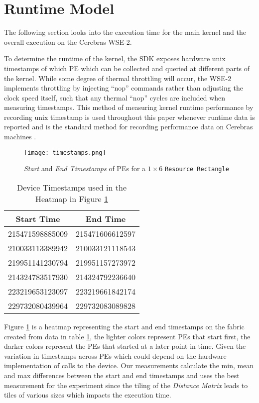 \section{Runtime Model} \label{section:execution_time}

The following section looks into the execution time for the main kernel and the overall execution on the Cerebras WSE-2.

To determine the runtime of the kernel, the SDK exposes hardware unix timestamps of which PE which can be collected and queried at different parts of the kernel. While some degree of thermal throttling will occur, the WSE-2 implements throttling by injecting “nop” commands rather than adjusting the clock speed itself, such that any thermal “nop” cycles are included when measuring timestamps. This method of measuring kernel runtime performance by recording unix timestamp is used throughout this paper whenever runtime data is reported and is the standard method for recording performance data on Cerebras machines \cite{9}.

\begin{figure}[h!]
    \texttt{[image: timestamps.png]}
    \centering
    \caption{\textit{Start} and \textit{End Timestamps} of PEs for a $1 \times 6$ \texttt{Resource Rectangle}}
    \label{fig:timestamps}
\end{figure}

\begin{table}[h]
    \centering
    \begin{tabular}{|c|c|}
        \hline
        Start Time & End Time \\
        \hline
        215471598885009 & 215471606612597 \\
        210033113389942 & 210033121118543 \\
        219951141230794 & 219951157273972 \\
        214324783517930 & 214324792236640 \\
        223219653123097 & 223219661842174 \\
        229732080439964 & 229732083089828 \\
        \hline
    \end{tabular}
    \caption{Device Timestamps used in the Heatmap in Figure \ref{fig:timestamps}}
    \label{table:timestamps}
\end{table}

Figure \ref{fig:timestamps} is a heatmap representing the start and end timestamps on the fabric created from data in table \ref{table:timestamps}, the lighter colors represent PEs that start first, the darker colors represent the PEs that started at a later point in time. Given the variation in timestamps across PEs which could depend on the hardware implementation of calls to the device. Our measurements calculate the min, mean and max differences between the start and end timestamps and uses the best measurement for the experiment since the tiling of the \textit{Distance Matrix} leads to tiles of various sizes which impacts the execution time.

